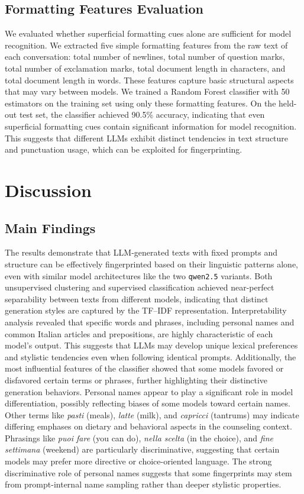 \documentclass[11pt]{article}
\begin{document}
\subsection{Formatting Features Evaluation}

We evaluated whether superficial formatting cues alone are sufficient for model recognition. We extracted five simple formatting features from the raw text of each conversation: total number of newlines, total number of question marks, total number of exclamation marks, total document length in characters, and total document length in words.
These features capture basic structural aspects that may vary between models. We trained a Random Forest classifier with 50 estimators on the training set using only these formatting features. On the held-out test set, the classifier achieved 90.5\% accuracy, indicating that even superficial formatting cues contain significant information for model recognition. This suggests that different LLMs exhibit distinct tendencies in text structure and punctuation usage, which can be exploited for fingerprinting.

\section{Discussion}

\subsection{Main Findings}

The results demonstrate that LLM-generated texts with fixed prompts and structure can be effectively fingerprinted based on their linguistic patterns alone, even with similar model architectures like the two \texttt{qwen2.5} variants. Both unsupervised clustering and supervised classification achieved near-perfect separability between texts from different models, indicating that distinct generation styles are captured by the TF--IDF representation.
Interpretability analysis revealed that specific words and phrases, including personal names and common Italian articles and prepositions, are highly characteristic of each model's output. This suggests that LLMs may develop unique lexical preferences and stylistic tendencies even when following identical prompts. Additionally, the most influential features of the classifier showed that some models favored or disfavored certain terms or phrases, further highlighting their distinctive generation behaviors.
Personal names appear to play a significant role in model differentiation, possibly reflecting biases of some models toward certain names. Other terms like \emph{pasti} (meals), \emph{latte} (milk), and \emph{capricci} (tantrums) may indicate differing emphases on dietary and behavioral aspects in the counseling context. Phrasings like \emph{puoi fare} (you can do), \emph{nella scelta} (in the choice), and \emph{fine settimana} (weekend) are particularly discriminative, suggesting that certain models may prefer more directive or choice-oriented language. The strong discriminative role of personal names suggests that some fingerprints may stem from prompt-internal name sampling rather than deeper stylistic properties.
\end{document}
